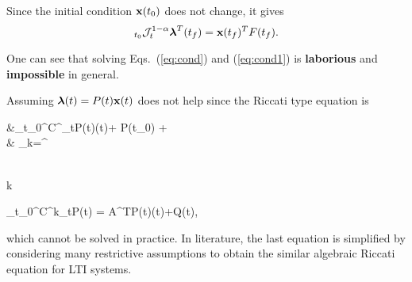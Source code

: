 \documentclass[
rightlogo=images/presentation/acc2020,
leftlogo=images/presentation/siue.png,
leftbottomlogo=images/presentation/adroco
]{ad-conference}
\begin{document}
\begin{frame}[shrink=10]
	\begin{block}{}
		Since the initial condition $ \mathbf{x}(t_0) $ does not change, it gives
		\begin{equation}\label{eq:cond1}
			_{t_0}\mathcal{J}^{1-\alpha}_t \boldsymbol{\lambda}^T(t_f)= \mathbf{x}(t_f)^TF(t_f).
		\end{equation}
	\end{block}

	\begin{blockB}{}
		One can see that solving Eqs.~(\ref{eq:cond}) and (\ref{eq:cond1}) is \textbf{laborious} and \textbf{impossible} in general. 
	\end{blockB}
	\begin{blockr}{}	
		Assuming $ \boldsymbol{\lambda}(t)=P(t)\mathbf{x}(t) $ does not help since the Riccati type equation is 
		\begin{flalign}\label{key}\nonumber
			&{_{t_0}^C^{\alpha}_t}P(t)\;\x(t)+ P({t_0}) +
			\\ \nonumber
			&
			\sum_{k=\ceil{\alpha}}^{\infty}
			\begin{pmatrix}
				\alpha \\
				k
			\end{pmatrix}
			{_{t_0}^C^{k}_t}{P(t)}
			= A^TP(t)\x(t)+Q\x(t),
		\end{flalign}
		which cannot be solved in practice. In literature, the last equation is simplified by considering many restrictive assumptions to obtain the similar algebraic Riccati equation for LTI systems.
	\end{blockr}
\end{frame}

\section{}
\section{}
\section{}
\end{document}
